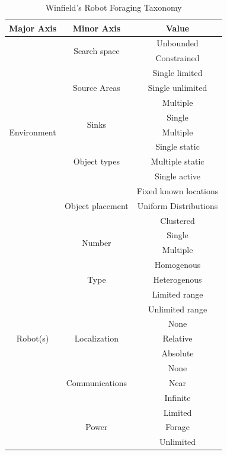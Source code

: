 \begin{table}
\centering
    \caption{Winfield's Robot Foraging Taxonomy}
    \label{foragingtaxonomytable_part1}
    
\begin{tabular}{ | c | c | c |}
	\hline
	Major Axis & Minor Axis & Value  \\ \hline
	\multirow{13}{*}{Environment}
		& \multirow{2}{*}{Search space} 
			& Unbounded \\  
		& 	& Constrained \\ \cline{2-3}
		& \multirow{3}{*}{Source Areas} 
			& Single limited \\ 
		&	& Single unlimited \\
		&	& Multiple \\ \cline{2-3}
		& \multirow{2}{*}{Sinks} 
			& Single \\
		&	& Multiple \\ \cline{2-3}
		& \multirow{3}{*}{Object types} 
			& Single static \\
		&	& Multiple static \\
		&	& Single active \\ \cline{2-3}
		& \multirow{3}{*}{Object placement} 
			& Fixed known locations \\
		&	& Uniform Distributions \\
		&	& Clustered \\\hline
	\multirow{16}{*}{Robot(s)}
		& \multirow{2}{*}{Number} 
			& Single \\  
		& 	& Multiple \\ \cline{2-3}
		& \multirow{3}{*}{Type} 
			& Homogenous \\ 
		&	& Heterogenous \\ \cline{2-3}
		& \multirow{2}{*}{Object Sensing} 
			& Limited range \\
		&	& Unlimited range\\ \cline{2-3}
		& \multirow{3}{*}{Localization} 
			& None \\
		&	& Relative \\
		&	& Absolute \\ \cline{2-3}
		& \multirow{3}{*}{Communications} 
			& None \\
		&	& Near \\
		&	& Infinite \\\cline{2-3}
		& \multirow{3}{*}{Power} 
			& Limited \\
		&	& Forage \\
		&	& Unlimited \\\hline
\end{tabular}
\end{table}

